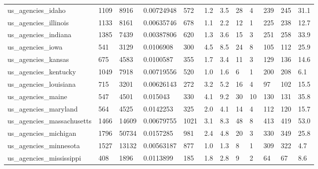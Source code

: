 \begin{longtable}{llllllllllll}
 us\_agencies\_idaho                                  & 1109       & 8916      & 0.00724948  & 572   & 1.2    & 3.5    & 28    & 4      & 239    & 245    & 31.1    \\
 us\_agencies\_illinois                               & 1133       & 8161      & 0.00635746  & 678   & 1.1    & 2.2    & 12    & 1      & 225    & 238    & 12.7    \\
 us\_agencies\_indiana                                & 1385       & 7439      & 0.00387806  & 620   & 1.3    & 3.6    & 15    & 3      & 251    & 258    & 33.9    \\
 us\_agencies\_iowa                                   & 541        & 3129      & 0.0106908   & 300   & 4.5    & 8.5    & 24    & 8      & 105    & 112    & 25.9    \\
 us\_agencies\_kansas                                 & 675        & 4583      & 0.0100587   & 355   & 1.7    & 3.4    & 11    & 3      & 129    & 136    & 14.6    \\
 us\_agencies\_kentucky                               & 1049       & 7918      & 0.00719556  & 520   & 1.0    & 1.6    & 6     & 1      & 200    & 208    & 6.1     \\
 us\_agencies\_louisiana                              & 715        & 3201      & 0.00626143  & 272   & 3.2    & 5.2    & 16    & 4      & 97     & 102    & 15.5    \\
 us\_agencies\_maine                                  & 547        & 4501      & 0.015043    & 330   & 4.1    & 9.2    & 30    & 10     & 130    & 131    & 35.8    \\
 us\_agencies\_maryland                               & 564        & 4525      & 0.0142253   & 325   & 2.0    & 4.1    & 14    & 4      & 112    & 120    & 15.7    \\
 us\_agencies\_massachusetts                          & 1466       & 14609     & 0.00679755  & 1021  & 3.1    & 8.3    & 48    & 8      & 413    & 419    & 53.0    \\
 us\_agencies\_michigan                               & 1796       & 50734     & 0.0157285   & 981   & 2.4    & 4.8    & 20    & 3      & 330    & 349    & 25.8    \\
 us\_agencies\_minnesota                              & 1527       & 13132     & 0.00563187  & 877   & 1.0    & 1.3    & 8     & 1      & 309    & 322    & 4.7     \\
 us\_agencies\_mississippi                            & 408        & 1896      & 0.0113899   & 185   & 1.8    & 2.8    & 9     & 2      & 64     & 67     & 8.6     \\

\end{longtable}
